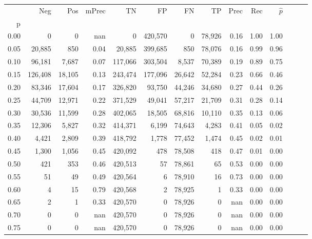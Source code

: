 \begin{tabular}{rrrrrrrrrrrrrr}
\toprule
{} &      Neg &     Pos & mPrec &       TN &       FP &      FN &      TP &  Prec &   Rec & $\hat{p}$ \\
p    &          &         &       &          &          &         &         &       &       &           \\
\midrule
0.00 &        0 &       0 &   nan &        0 &  420,570 &       0 &  78,926 &  0.16 &  1.00 &      1.00 \\
0.05 &   20,885 &     850 &  0.04 &   20,885 &  399,685 &     850 &  78,076 &  0.16 &  0.99 &      0.96 \\
0.10 &   96,181 &   7,687 &  0.07 &  117,066 &  303,504 &   8,537 &  70,389 &  0.19 &  0.89 &      0.75 \\
0.15 &  126,408 &  18,105 &  0.13 &  243,474 &  177,096 &  26,642 &  52,284 &  0.23 &  0.66 &      0.46 \\
0.20 &   83,346 &  17,604 &  0.17 &  326,820 &   93,750 &  44,246 &  34,680 &  0.27 &  0.44 &      0.26 \\
0.25 &   44,709 &  12,971 &  0.22 &  371,529 &   49,041 &  57,217 &  21,709 &  0.31 &  0.28 &      0.14 \\
0.30 &   30,536 &  11,599 &  0.28 &  402,065 &   18,505 &  68,816 &  10,110 &  0.35 &  0.13 &      0.06 \\
0.35 &   12,306 &   5,827 &  0.32 &  414,371 &    6,199 &  74,643 &   4,283 &  0.41 &  0.05 &      0.02 \\
0.40 &    4,421 &   2,809 &  0.39 &  418,792 &    1,778 &  77,452 &   1,474 &  0.45 &  0.02 &      0.01 \\
0.45 &    1,300 &   1,056 &  0.45 &  420,092 &      478 &  78,508 &     418 &  0.47 &  0.01 &      0.00 \\
0.50 &      421 &     353 &  0.46 &  420,513 &       57 &  78,861 &      65 &  0.53 &  0.00 &      0.00 \\
0.55 &       51 &      49 &  0.49 &  420,564 &        6 &  78,910 &      16 &  0.73 &  0.00 &      0.00 \\
0.60 &        4 &      15 &  0.79 &  420,568 &        2 &  78,925 &       1 &  0.33 &  0.00 &      0.00 \\
0.65 &        2 &       1 &  0.33 &  420,570 &        0 &  78,926 &       0 &   nan &  0.00 &      0.00 \\
0.70 &        0 &       0 &   nan &  420,570 &        0 &  78,926 &       0 &   nan &  0.00 &      0.00 \\
0.75 &        0 &       0 &   nan &  420,570 &        0 &  78,926 &       0 &   nan &  0.00 &      0.00 \\

\end{tabular}
